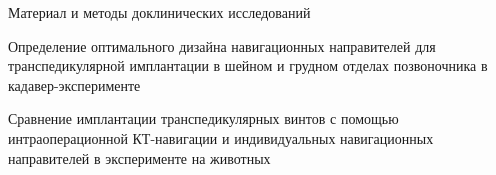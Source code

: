 
Материал и методы доклинических исследований

\item Определение оптимального дизайна навигационных направителей
для
транспедикулярной имплантации в шейном и грудном отделах позвоночника в
кадавер-эксперименте

\item 
	Сравнение имплантации транспедикулярных винтов с помощью
	интраоперационной КТ-навигации и индивидуальных навигационных
	направителей в эксперименте на животных
